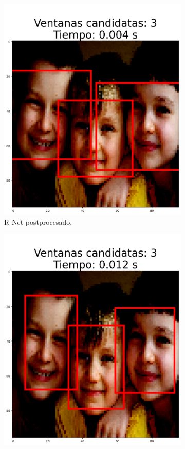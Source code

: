 \begin{figure}[!htpb]
\begin{subfigure}[b]{0.28\textwidth}
         \includegraphics[width=\textwidth]{./Figures/test_tf_rnet_c.png}
         \caption{R-Net postprocesado.}
         \label{fig:2de3}
     \end{subfigure}
     \hfill
	 \begin{subfigure}[b]{0.28\textwidth}
         \centering
         \includegraphics[width=\textwidth]{./Figures/test_tf_onet_c.png}

\end{subfigure}
\end{figure}

